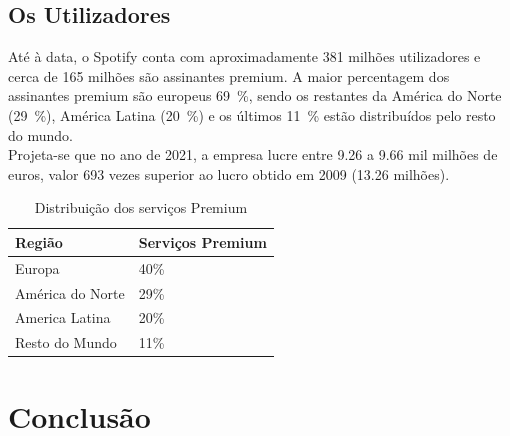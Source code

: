 \section{Os Utilizadores}
Até à data, o Spotify conta com aproximadamente 381 milhões utilizadores e  cerca de 165 milhões são assinantes premium. A maior percentagem dos assinantes premium são europeus 69~\%, sendo os restantes da América do Norte (29~\%), América Latina (20~\%) e os últimos 11~\% estão distribuídos pelo resto do mundo.\\
Projeta-se que no ano de 2021, a empresa lucre entre 9.26 a 9.66 mil milhões de euros, valor 693 vezes superior ao lucro obtido em 2009 (13.26 milhões).
	

\begin{table}[H]

	\centering
	\caption{Distribuição dos serviços Premium}
	\begin{tabular}{l|l}
	Região & Serviços Premium \\
	\hline
	Europa      &    40\%  \\
	América do Norte       & 29\%  \\
	America Latina       &  20\%  \\
	Resto do Mundo       &    11\%
	\end{tabular}
\end{table}

\chapter{Conclusão}
\label{conclusao}

